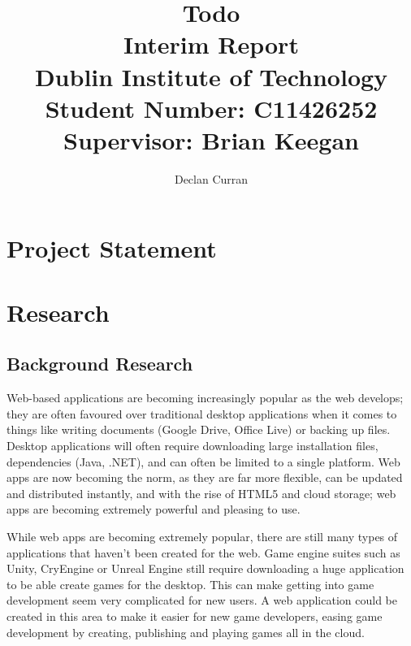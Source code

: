 \documentclass[a4paper, 12pt]{article}
\begin{document}
\title{
	{Todo}\\
	\large{Interim Report}\\
	\large{Dublin Institute of Technology}\\
	Student Number: C11426252\\
	Supervisor: Brian Keegan
}
\author{Declan Curran}
\maketitle
\newpage

\setcounter{tocdepth}{3}
\tableofcontents
\newpage

\section{Project Statement}
\section{Research}
\subsection{Background Research}

Web-based applications are becoming increasingly popular as the web develops; they are often favoured over traditional desktop applications when it comes to things like writing documents (Google Drive, Office Live) or backing up files. Desktop applications will often require downloading large installation files, dependencies (Java, .NET), and can often be limited to a single platform. Web apps are now becoming the norm, as they are far more flexible, can be updated and distributed instantly, and with the rise of HTML5 and cloud storage; web apps are becoming extremely powerful and pleasing to use.



While web apps are becoming extremely popular, there are still many types of applications that haven't been created for the web. Game engine suites such as Unity, CryEngine or Unreal Engine still require downloading a huge application to be able create games for the desktop. This can make getting into game development seem very complicated for new users. A web application could be created in this area to make it easier for new game developers, easing game development by creating, publishing and playing games all in the cloud.
\end{document}
